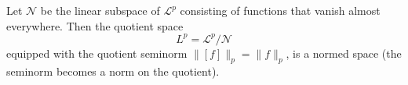 Let $\mathcal{N}$ be the linear subspace of $\mathcal{L}^p$ consisting of functions that vanish almost everywhere. Then the quotient space
$$L^p = \mathcal{L}^p / \mathcal{N}$$
equipped with the quotient seminorm $\|[f]\|_p = \|f\|_p$, is a normed space (the seminorm becomes a norm on the quotient).
